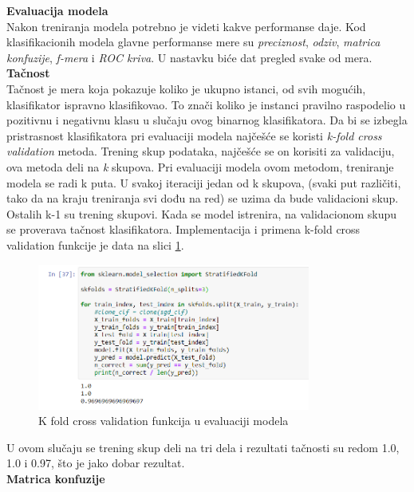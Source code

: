 \documentclass[a4paper,12pt]{report}
\begin{document}
\textbf{Evaluacija modela}\\

Nakon treniranja modela potrebno je videti kakve performanse daje. Kod klasifikacionih modela glavne performanse mere su \textit{preciznost}, \textit{odziv}, \textit{matrica konfuzije}, \textit{f-mera} i \textit{ROC kriva}. U nastavku biće dat pregled svake od mera. \\

\textbf{Tačnost}\\

Tačnost je mera koja pokazuje koliko je ukupno istanci, od svih mogućih, klasifikator ispravno klasifikovao. To znači koliko je instanci pravilno raspodelio u pozitivnu i negativnu klasu u slučaju ovog binarnog klasifikatora. Da bi se izbegla pristrasnost klasifikatora pri evaluaciji modela najčešće se  koristi \textit{k-fold cross validation} metoda. Trening skup podataka, najčešće se on korisiti za validaciju, ova metoda deli na \textit{k} skupova. Pri evaluaciji modela ovom metodom, treniranje modela se radi k puta. U svakoj iteraciji jedan od k skupova, (svaki put različiti, tako da na kraju treniranja svi dođu na red) se uzima da bude validacioni skup. Ostalih k-1 su trening skupovi. Kada se model istrenira, na validacionom skupu se proverava tačnost klasifikatora. Implementacija i primena k-fold cross validation funkcije je data na slici \ref{fig:logisticprecission}.

\begin{figure}[h]
    \centering
    \includegraphics[width=0.8\textwidth]{logistic_precision.png}
    \caption{K fold cross validation funkcija u evaluaciji modela}\label{fig:logisticprecission}
\end{figure}

U ovom slučaju se trening skup deli na tri dela i rezultati tačnosti su redom 1.0, 1.0 i 0.97, što je jako dobar rezultat.\\

\textbf{Matrica konfuzije}\\
\end{document}
